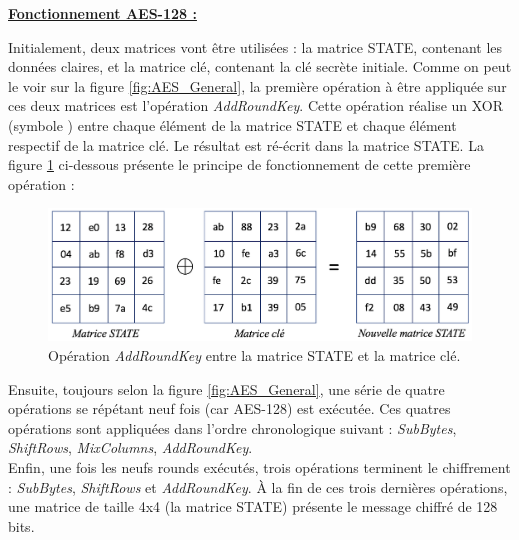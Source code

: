 \documentclass[oneside]{book}
\begin{document}
\vspace{0.5cm}
\underline{\textbf{Fonctionnement AES-128 :}} 

\hspace{-0.5cm}Initialement, deux matrices vont être utilisées : la matrice STATE, contenant les données claires, et la matrice clé, contenant la clé secrète initiale. Comme on peut le voir sur la figure \ref{fig:AES_General}, la première opération à être appliquée sur ces deux matrices est l'opération \textit{AddRoundKey}. Cette opération réalise un XOR (symbole \oplus) entre chaque élément de la matrice STATE et chaque élément respectif de la matrice clé. Le résultat est ré-écrit dans la matrice STATE. La figure \ref{fig:XOR} ci-dessous présente le principe de fonctionnement de cette première opération :
\begin{figure}[htbp]
    \centering
    \includegraphics[scale=0.52]{image/XOR}
    \caption{Opération \textit{AddRoundKey} entre la matrice STATE et la matrice clé.}
    \label{fig:XOR}
\end{figure}

\hspace{-0.5 cm}Ensuite, toujours selon la figure \ref{fig:AES_General}, une série de quatre opérations se répétant neuf fois (car AES-128) est exécutée. Ces quatres opérations sont appliquées dans l'ordre chronologique suivant : \textit{SubBytes}, \textit{ShiftRows}, \textit{MixColumns}, \textit{AddRoundKey}. \\
Enfin, une fois les neufs rounds exécutés, trois opérations terminent le chiffrement : \textit{SubBytes}, \textit{ShiftRows} et \textit{AddRoundKey}. À la fin de ces trois dernières opérations, une matrice de taille 4x4 (la matrice STATE) présente le message chiffré de 128 bits.
\end{document}
